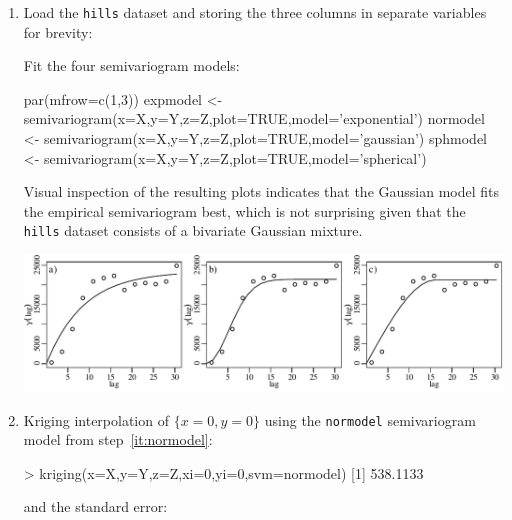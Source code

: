 \begin{enumerate}
  
\item\label{it:normodel} Load the \texttt{hills} dataset and storing
  the three columns in separate variables for brevity:


Fit the four semivariogram models:

\begin{script}[firstnumber=5]
par(mfrow=c(1,3))
expmodel <- semivariogram(x=X,y=Y,z=Z,plot=TRUE,model='exponential')
normodel <- semivariogram(x=X,y=Y,z=Z,plot=TRUE,model='gaussian')
sphmodel <- semivariogram(x=X,y=Y,z=Z,plot=TRUE,model='spherical')
\end{script}

Visual inspection of the resulting plots indicates that the Gaussian
model fits the empirical semivariogram best, which is not surprising
given that the \texttt{hills} dataset consists of a bivariate Gaussian
mixture.

\noindent\begin{minipage}[t][][b]{\linewidth}
\includegraphics[width=\linewidth]{../figures/hills.pdf}
\end{minipage}
\begin{minipage}[t][][t]{\linewidth}
\end{minipage}

\item Kriging interpolation of $\{x=0,y=0\}$ using the
  \texttt{normodel} semivariogram model from step~\ref{it:normodel}:

\begin{console}
> kriging(x=X,y=Y,z=Z,xi=0,yi=0,svm=normodel)
[1] 538.1133
\end{console}

\noindent and the standard error:


\end{enumerate}
